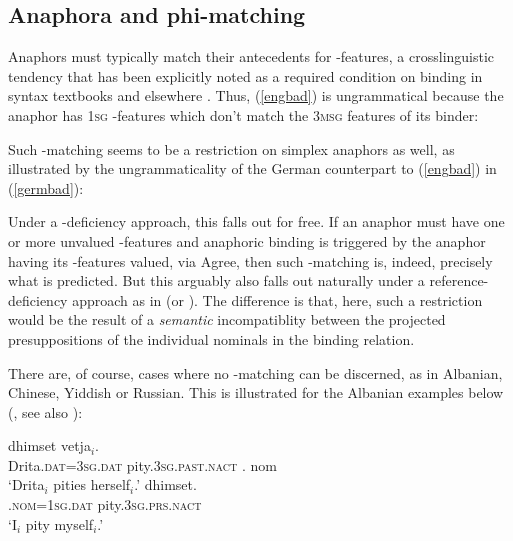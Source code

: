 \documentclass[output=paper, modfonts, nonflat]{langsci/langscibook}
\begin{document}
\subsection{Anaphora and phi-matching}

Anaphors must typically match their antecedents for \ph-features, a
crosslinguistic tendency that has been explicitly noted as a required
condition on binding in syntax textbooks and elsewhere
\citep{sagwasbend:2003, carnie:2007, heim:2008}. Thus, (\ref{engbad})
is ungrammatical because the anaphor has \textsc{1sg} \ph-features
which don't match the \textsc{3msg} features of its binder:

\z

\noindent Such \ph-matching seems to be a restriction on simplex anaphors as
well, as illustrated by the ungrammaticality of the German counterpart
to (\ref{engbad}) in (\ref{germbad}):

\z

\noindent Under a \ph-deficiency approach, this falls out for free. If an
anaphor must have one or more unvalued \ph-features and anaphoric
binding is triggered by the anaphor having its \ph-features valued,
via Agree, then such \ph-matching is, indeed, precisely what is
predicted. But this arguably also falls out naturally under a
reference-deficiency approach as in \citet{Hicks:2009} (or
\citealt{adgerramchand:2005}). The difference is that, here, such a
restriction would be the result of a \emph{semantic} incompatiblity
between the projected presuppositions of the individual nominals in
the binding relation. 

There are, of course, cases where no \ph-matching can be discerned, as
in Albanian, Chinese, Yiddish or Russian. This is illustrated for the
Albanian examples below (\citealt[270--271]{woolford:1999}, see also
\citealt[91]{hubbard:1985}):

\ea\label{alb2} dhimset vetja$_i$.\\
Drita.{\scshape dat=3sg.dat} pity.{\scshape 3sg.past.nact} \anaph.{\sc
  nom}\\
\glt `Drita$_i$ pities herself$_i$.'
\ex\label{alb3} dhimset.\\
\anaph.{\scshape nom=1sg.dat} pity.{\scshape 3sg.prs.nact}\\
\glt `I$_i$ pity myself$_i$.'  \z
\end{document}
